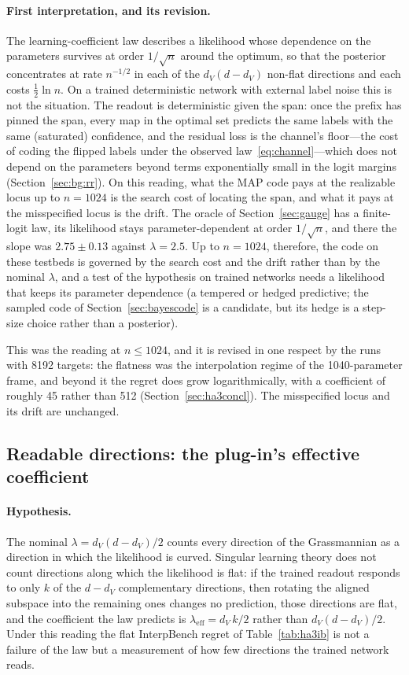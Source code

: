 \documentclass[11pt,a4paper]{article}
\newcommand{\dv}{d_V}
\begin{document}
\paragraph{First interpretation, and its revision.} The learning-coefficient law describes a likelihood whose dependence on the parameters survives at order $1/\sqrt n$ around the optimum, so that the posterior concentrates at rate $n^{-1/2}$ in each of the $\dv(d-\dv)$ non-flat directions and each costs $\tfrac12\ln n$. On a trained deterministic network with external label noise this is not the situation. The readout is deterministic given the span: once the prefix has pinned the span, every map in the optimal set predicts the same labels with the same (saturated) confidence, and the residual loss is the channel's floor---the cost of coding the flipped labels under the observed law~\eqref{eq:channel}---which does not depend on the parameters beyond terms exponentially small in the logit margins (Section~\ref{sec:bg:rr}). On this reading, what the MAP code pays at the realizable locus up to $n=1024$ is the search cost of locating the span, and what it pays at the misspecified locus is the drift. The oracle of Section~\ref{sec:gauge} has a finite-logit law, its likelihood stays parameter-dependent at order $1/\sqrt n$, and there the slope was $2.75\pm0.13$ against $\lambda=2.5$. Up to $n=1024$, therefore, the code on these testbeds is governed by the search cost and the drift rather than by the nominal $\lambda$, and a test of the hypothesis on trained networks needs a likelihood that keeps its parameter dependence (a tempered or hedged predictive; the sampled code of Section~\ref{sec:bayescode} is a candidate, but its hedge is a step-size choice rather than a posterior).

This was the reading at $n\le1024$, and it is revised in one respect by the runs with 8192 targets: the flatness was the interpolation regime of the 1040-parameter frame, and beyond it the regret does grow logarithmically, with a coefficient of roughly 45 rather than 512 (Section~\ref{sec:ha3concl}). The misspecified locus and its drift are unchanged.

\subsection{Readable directions: the plug-in's effective coefficient}
\label{sec:ha3eff}

\paragraph{Hypothesis.} The nominal $\lambda=\dv(d-\dv)/2$ counts every direction of the Grassmannian as a direction in which the likelihood is curved. Singular learning theory does not count directions along which the likelihood is flat: if the trained readout responds to only $k$ of the $d-\dv$ complementary directions, then rotating the aligned subspace into the remaining ones changes no prediction, those directions are flat, and the coefficient the law predicts is $\lambda_{\mathrm{eff}}=\dv\,k/2$ rather than $\dv(d-\dv)/2$. Under this reading the flat InterpBench regret of Table~\ref{tab:ha3ib} is not a failure of the law but a measurement of how few directions the trained network reads.
\end{document}
